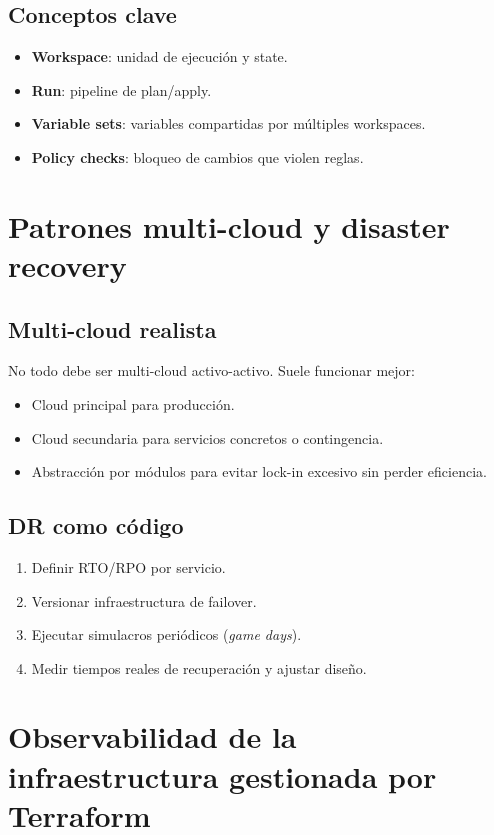 \documentclass[12pt,a4paper]{article}
\begin{document}
\subsection{Conceptos clave}
\begin{itemize}
		\item \textbf{Workspace}: unidad de ejecución y state.
		\item \textbf{Run}: pipeline de plan/apply.
		\item \textbf{Variable sets}: variables compartidas por múltiples workspaces.
		\item \textbf{Policy checks}: bloqueo de cambios que violen reglas.
\end{itemize}

\section{Patrones multi-cloud y disaster recovery}

\subsection{Multi-cloud realista}
No todo debe ser multi-cloud activo-activo. Suele funcionar mejor:
\begin{itemize}
		\item Cloud principal para producción.
		\item Cloud secundaria para servicios concretos o contingencia.
		\item Abstracción por módulos para evitar lock-in excesivo sin perder eficiencia.
\end{itemize}

\subsection{DR como código}
\begin{enumerate}
		\item Definir RTO/RPO por servicio.
		\item Versionar infraestructura de failover.
		\item Ejecutar simulacros periódicos (\textit{game days}).
		\item Medir tiempos reales de recuperación y ajustar diseño.
\end{enumerate}

\section{Observabilidad de la infraestructura gestionada por Terraform}
\end{document}
